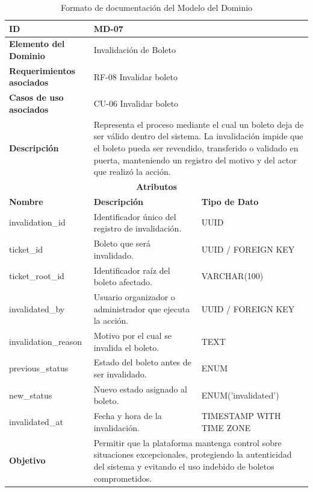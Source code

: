 \documentclass[12pt,letterpaper]{article}
\begin{document}
\begin{table}[H]
\centering
\scriptsize
\renewcommand{\arraystretch}{1.12}
\setlength{\tabcolsep}{4pt}

\begin{tabularx}{\textwidth}{|p{3.2cm}|X|p{3.8cm}|}
\hline
\textbf{ID} & MD-07 & \\ \hline

\textbf{Elemento del Dominio} & 
\multicolumn{2}{X|}{Invalidación de Boleto} \\ \hline

\textbf{Requerimientos asociados} & 
\multicolumn{2}{X|}{RF-08 Invalidar boleto} \\ \hline

\textbf{Casos de uso asociados} & 
\multicolumn{2}{X|}{CU-06 Invalidar boleto} \\ \hline

\textbf{Descripción} & 
\multicolumn{2}{X|}{Representa el proceso mediante el cual un boleto deja de ser válido dentro del sistema. La invalidación impide que el boleto pueda ser revendido, transferido o validado en puerta, manteniendo un registro del motivo y del actor que realizó la acción.} \\ \hline

\multicolumn{3}{|c|}{\textbf{Atributos}} \\ \hline

\textbf{Nombre} & \textbf{Descripción} & \textbf{Tipo de Dato} \\ \hline

invalidation\_id & Identificador único del registro de invalidación. & UUID \\ \hline
ticket\_id & Boleto que será invalidado. & UUID / FOREIGN KEY \\ \hline
ticket\_root\_id & Identificador raíz del boleto afectado. & VARCHAR(100) \\ \hline
invalidated\_by & Usuario organizador o administrador que ejecuta la acción. & UUID / FOREIGN KEY \\ \hline
invalidation\_reason & Motivo por el cual se invalida el boleto. & TEXT \\ \hline
previous\_status & Estado del boleto antes de ser invalidado. & ENUM\\ \hline
new\_status & Nuevo estado asignado al boleto. & ENUM('invalidated') \\ \hline
invalidated\_at & Fecha y hora de la invalidación. & TIMESTAMP WITH TIME ZONE \\ \hline

\textbf{Objetivo} & 
\multicolumn{2}{X|}{Permitir que la plataforma mantenga control sobre situaciones excepcionales, protegiendo la autenticidad del sistema y evitando el uso indebido de boletos comprometidos.} \\ \hline

\end{tabularx}

\caption{Formato de documentación del Modelo del Dominio}
\label{tab:modelo_dominio_invalidacion_boleto}
\normalsize
\end{table}
\end{document}
